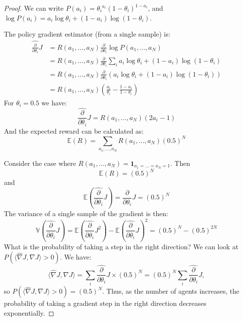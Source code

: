 \documentclass{article}
\newcommand{\dd}{\frac{\partial}{\partial \theta_i}}
\begin{document}
\begin{proof}
We can write $P(a_i) = {\theta_i}^{a_i}  (1-\theta_i)^{1-a_i}$, and $\log P(a_i) = a_i \log {\theta_i} + (1-a_i)\log(1-\theta_i)$.

The policy gradient estimator (from a single sample) is:
\begin{equation}
\begin{split}
\hat{\dd} J &= R(a_1,\dots,a_N) \dd \log P(a_1,\dots,a_N) \\ 
& = R(a_1,\dots,a_N) \dd \sum_i a_i \log {\theta_i} + (1-a_i)\log(1-\theta_i) \\
& = R(a_1,\dots,a_N) \dd (a_i \log {\theta_i} + (1-a_i)\log(1-\theta_i)) \\
& = R(a_1,\dots,a_N) \left(\frac{a_i}{\theta_i} - \frac{1-a_i}{1-\theta_i} \right)
\end{split}    
\end{equation}
For $\theta_i = 0.5$ we have: 
$$
\hat{\dd} J = R(a_1,\dots,a_N) \left(2 a_i- 1\right)
$$
And the expected reward can be calculated as:
$$
\mathbb E (R) = \sum_{a_1,\dots,a_N} R(a_1,\dots,a_N) (0.5)^N
$$

Consider the case where $R(a_1,\dots,a_N) = \mathbf{1}_{a_1=\dots=a_N=1}$. Then 
$$
\mathbb E (R) = (0.5)^N
$$
and 
$$
\mathbb E (\hat{\dd} J ) = \dd J = (0.5)^N
$$
The variance of a single sample of the gradient is then:
$$
\mathbb V (\hat{\dd} J ) = \mathbb E (\hat{\dd} J^2 ) - \mathbb E (\hat{\dd} J ) ^2 = (0.5)^N - (0.5)^{2N}
$$
What is the probability of taking a step in the right direction? We can look at $P(\langle \hat{\nabla} J, \nabla J \rangle > 0)$. We have:
$$
\langle \hat{\nabla} J, \nabla J \rangle = \sum_i \hat{\dd} J  \times (0.5)^N = (0.5)^N \sum_i \hat{\dd} J,
$$
so $P(\langle \hat{\nabla} J, \nabla J \rangle > 0) = (0.5)^N$. Thus, as the number of agents increases, the probability of taking a gradient step in the right direction decreases exponentially.
\end{proof}
\end{document}
